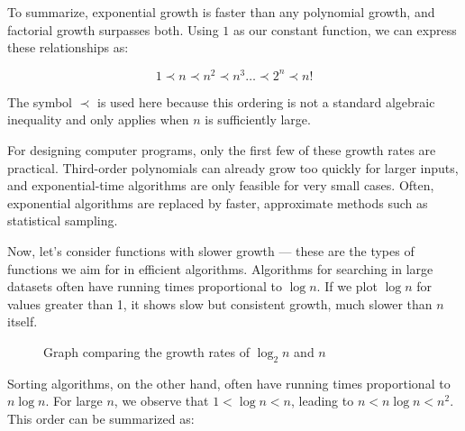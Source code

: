 To summarize, exponential growth is faster than any polynomial growth, and factorial growth surpasses both. Using \(1\) as our constant function, we can express these relationships as:

\[
1 \prec n \prec n^2 \prec n^3 \ldots \prec 2^n \prec n!
\]

The symbol \( \prec \) is used here because this ordering is not a standard algebraic inequality and only applies when \( n \) is sufficiently large.

For designing computer programs, only the first few of these growth rates are practical. Third-order polynomials can already grow too quickly for larger inputs, and exponential-time algorithms are only feasible for very small cases. Often, exponential algorithms are replaced by faster, approximate methods such as statistical sampling.

Now, let's consider functions with slower growth — these are the types of functions we aim for in efficient algorithms. Algorithms for searching in large datasets often have running times proportional to \( \log n \). If we plot \( \log n \) for values greater than 1, it shows slow but consistent growth, much slower than \( n \) itself.

\begin{figure}[htbp]
    \centering
    \caption{Graph comparing the growth rates of $\log_2 n$ and $n$}
\end{figure}

Sorting algorithms, on the other hand, often have running times proportional to \( n \log n \). For large \( n \), we observe that \( 1 < \log n < n \), leading to \( n < n \log n < n^2 \). This order can be summarized as:

